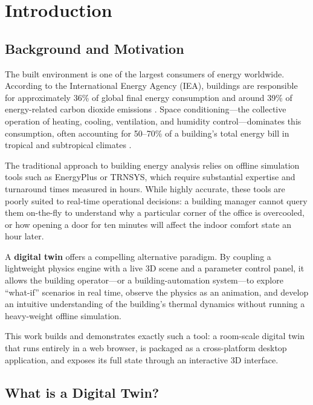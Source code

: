 \documentclass[12pt,a4paper]{report}
\begin{document}
\chapter{Introduction}
\label{ch:intro}

\section{Background and Motivation}
\label{sec:motivation}

The built environment is one of the largest consumers of energy worldwide. According to the International Energy Agency (IEA), buildings are responsible for approximately 36\% of global final energy consumption and around 39\% of energy-related carbon dioxide emissions \cite{iea2022}. Space conditioning---the collective operation of heating, cooling, ventilation, and humidity control---dominates this consumption, often accounting for 50--70\% of a building's total energy bill in tropical and subtropical climates \cite{ashrae2021}.

The traditional approach to building energy analysis relies on offline simulation tools such as EnergyPlus \cite{crawley2001} or TRNSYS, which require substantial expertise and turnaround times measured in hours. While highly accurate, these tools are poorly suited to real-time operational decisions: a building manager cannot query them on-the-fly to understand why a particular corner of the office is overcooled, or how opening a door for ten minutes will affect the indoor comfort state an hour later.

A \textbf{digital twin} offers a compelling alternative paradigm. By coupling a lightweight physics engine with a live 3D scene and a parameter control panel, it allows the building operator---or a building-automation system---to explore ``what-if'' scenarios in real time, observe the physics as an animation, and develop an intuitive understanding of the building's thermal dynamics without running a heavy-weight offline simulation.

This work builds and demonstrates exactly such a tool: a room-scale digital twin that runs entirely in a web browser, is packaged as a cross-platform desktop application, and exposes its full state through an interactive 3D interface.

\section{What is a Digital Twin?}
\label{sec:what_is_dt}
\end{document}
